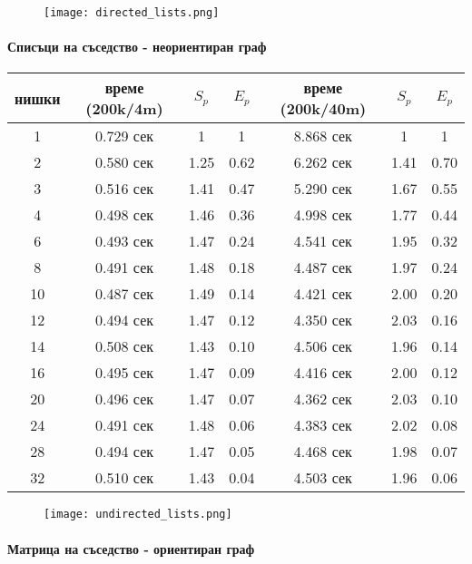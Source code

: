 \begin{figure}[H]
  \centering
  \texttt{[image: directed\_lists.png]}
\end{figure}

\paragraph*{Списъци на съседство - неориентиран граф}

\begin{center}
\begin{tabular}{ | c | c c c | c c c | }
  нишки & време (200k/4m) & $S_p$ & $E_p$ & време (200k/40m) & $S_p$ & $E_p$ \\
  \hline
  1 &  0.729 сек & 1 & 1 & 8.868 сек & 1 & 1 \\
  2 &  0.580 сек & 1.25 &  0.62 & 6.262 сек & 1.41 & 0.70 \\
  3 &  0.516 сек & 1.41 &  0.47 & 5.290 сек & 1.67 & 0.55 \\
  4 &  0.498 сек & 1.46 &  0.36 & 4.998 сек & 1.77 & 0.44 \\
  6 &  0.493 сек & 1.47 &  0.24 & 4.541 сек & 1.95 & 0.32 \\
  8 &  0.491 сек & 1.48 &  0.18 & 4.487 сек & 1.97 & 0.24 \\
  10 & 0.487 сек & 1.49 &  0.14 & 4.421 сек & 2.00 & 0.20 \\
  12 & 0.494 сек & 1.47 &  0.12 & 4.350 сек & 2.03 & 0.16 \\
  14 & 0.508 сек & 1.43 &  0.10 & 4.506 сек & 1.96 & 0.14 \\
  16 & 0.495 сек & 1.47 &  0.09 & 4.416 сек & 2.00 & 0.12 \\
  20 & 0.496 сек & 1.47 &  0.07 & 4.362 сек & 2.03 & 0.10 \\
  24 & 0.491 сек & 1.48 &  0.06 & 4.383 сек & 2.02 & 0.08 \\
  28 & 0.494 сек & 1.47 &  0.05 & 4.468 сек & 1.98 & 0.07 \\
  32 & 0.510 сек & 1.43 &  0.04 & 4.503 сек & 1.96 & 0.06 \\
\end{tabular}
\end{center}

\begin{figure}[H]
  \centering
  \texttt{[image: undirected\_lists.png]}
\end{figure}

\paragraph*{Матрица на съседство - ориентиран граф}

